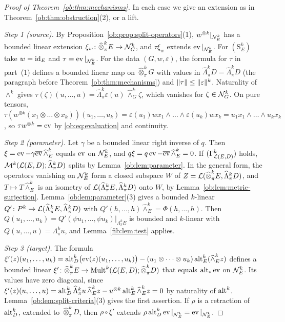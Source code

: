 \begin{proof}[Proof of Theorem~\ref{ob:thm:mechanisms}]
In each case we give an extension as in Theorem~\ref{ob:thm:obstruction}(2), or a lift.

\emph{Step 1 (source).} By Proposition~\ref{ob:prop:split-operators}(1), $w^{\otimes k}|_{\mathcal N^k_E}$ has a bounded linear
extension $\xi_w\colon\widehat\otimes^k_\pi E\to\mathcal N^k_G$, and $\tau\xi_w$ extends $\operatorname{ev}|_{\mathcal N^k_E}$. For $(\mathrm S^k_E)$
take $w=\mathrm{id}_E$ and $\tau=\operatorname{ev}|_{\mathcal N^k_E}$. For the data $(G,w,\varepsilon)$, the formula for $\tau$ in part~(1) defines a
bounded linear map on $\widehat\otimes^k_\pi G$ with values in $\widehat\Lambda^k_\pi\widehat D=\widehat\Lambda^k_\pi D$ (the
paragraph before Theorem~\ref{ob:thm:mechanisms}) and $\lVert \tau\rVert\le\lVert \varepsilon\rVert^k$. Naturality of $\wedge^k$ gives
$\tau(\zeta)(u,\dots,u)=\widehat\Lambda^k_\pi\varepsilon(u)\,\widehat\wedge^k_G\zeta$, which vanishes for
$\zeta\in\mathcal N^k_G$. On pure tensors,
$\tau(w^{\otimes k}(x_1\otimes\dots\otimes x_k))(u_1,\dots,u_k)=\varepsilon(u_1)wx_1\wedge\dots\wedge\varepsilon(u_k)wx_k
=u_1x_1\wedge\dots\wedge u_kx_k$, so $\tau w^{\otimes k}=\operatorname{ev}$ by \eqref{ob:eq:evaluation} and continuity.

\emph{Step 2 (parameter).} Let $\gamma$ be a bounded linear right inverse of $q$. Then
$\xi=\operatorname{ev}-\gamma\overline{\operatorname{ev}}\,\widehat\wedge^k_E$ equals $\operatorname{ev}$ on $\mathcal N^k_E$, and $q\xi=q\operatorname{ev}-\overline{\operatorname{ev}}\,\widehat\wedge^k_E=0$.
If $(\Gamma^k_{\mathcal L(E,D)})$ holds, $\mathcal M^k(\mathcal L(E,D);\widehat\Lambda^k_\pi D)$ splits by Lemma~\ref{ob:lem:parameter}. In the
general form, the operators vanishing on $\mathcal N^k_E$ form a closed subspace $W$ of
$Z=\mathcal L(\widehat\otimes^k_\pi E,\widehat\Lambda^k_\pi D)$, and $T\mapsto T\widehat\wedge^k_E$ is an isometry of
$\mathcal L(\widehat\Lambda^k_\pi E,\widehat\Lambda^k_\pi D)$ onto $W$, by Lemma~\ref{ob:lem:metric-surjection}.
Lemma~\ref{ob:lem:parameter}(3) gives a bounded $k$-linear
$Q'\colon P^k\to\mathcal L(\widehat\Lambda^k_\pi E,\widehat\Lambda^k_\pi D)$ with $Q'(h,\dots,h)\widehat\wedge^k_E=\Phi(h,\dots,h)$.
Then $Q(u_1,\dots,u_k)=Q'(\psi u_1,\dots,\psi u_k)|_{\Lambda^k_\pi E}$ is bounded and $k$-linear with
$Q(u,\dots,u)=\Lambda^k_\pi u$, and Lemma~\ref{fib:lem:test} applies.

\emph{Step 3 (target).} The formula
$\xi'(z)(u_1,\dots,u_k)=\operatorname{alt}^k_D\bigl(\operatorname{ev}(z)(u_1,\dots,u_k)\bigr)-(u_1\otimes\dots\otimes u_k)\operatorname{alt}^k_E(\widehat\wedge^k_Ez)$
defines a bounded linear $\xi'\colon\widehat\otimes^k_\pi E\to\operatorname{Mult}^k(\mathcal L(E,D);\widehat\otimes^k_\pi D)$ that equals
$\operatorname{alt}_*\operatorname{ev}$ on $\mathcal N^k_E$. Its values have zero diagonal, since
$\xi'(z)(u,\dots,u)=\operatorname{alt}^k_D\widehat\Lambda^k_\pi u\,\widehat\wedge^k_Ez-u^{\otimes k}\operatorname{alt}^k_E\widehat\wedge^k_Ez=0$ by
naturality of $\operatorname{alt}^k$. Lemma~\ref{ob:lem:split-criteria}(3) gives the first assertion. If $\rho$ is a retraction of
$\operatorname{alt}^k_D$, extended to $\widehat\otimes^k_\pi D$, then $\rho\circ\xi'$ extends $\rho\operatorname{alt}^k_D\operatorname{ev}|_{\mathcal N^k_E}=\operatorname{ev}|_{\mathcal N^k_E}$.


\end{proof}
